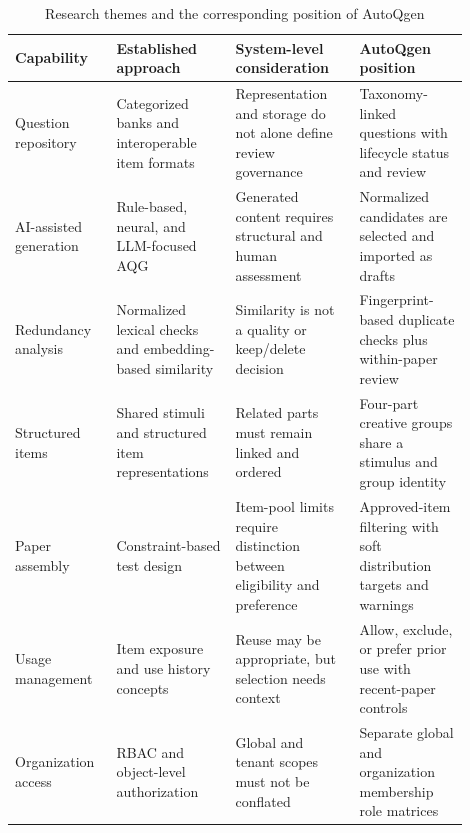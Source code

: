 \begin{table}[H]
    \centering
    \caption{Research themes and the corresponding position of AutoQgen}
    \label{tab:autoqgen_literature_position}
    \begin{tabular}{|p{0.19\linewidth}|p{0.24\linewidth}|p{0.25\linewidth}|p{0.22\linewidth}|}
        \hline
        \textbf{Capability} & \textbf{Established approach} & \textbf{System-level consideration} & \textbf{AutoQgen position} \\
        \hline
        Question repository & Categorized banks and interoperable item formats \cite{moodleQuestionBank,imsQti3} & Representation and storage do not alone define review governance & Taxonomy-linked questions with lifecycle status and review \\
        \hline
        AI-assisted generation & Rule-based, neural, and LLM-focused AQG \cite{hoshinoNakagawa2005,du2017,kurdi2020,singh2023ChatGPT} & Generated content requires structural and human assessment & Normalized candidates are selected and imported as drafts \\
        \hline
        Redundancy analysis & Normalized lexical checks and embedding-based similarity \cite{agirre2012sts,reimers2019sbert} & Similarity is not a quality or keep/delete decision & Fingerprint-based duplicate checks plus within-paper review \\
        \hline
        Structured items & Shared stimuli and structured item representations \cite{mislevy2003ecd,imsQti3} & Related parts must remain linked and ordered & Four-part creative groups share a stimulus and group identity \\
        \hline
        Paper assembly & Constraint-based test design \cite{vanDerLinden2005} & Item-pool limits require distinction between eligibility and preference & Approved-item filtering with soft distribution targets and warnings \\
        \hline
        Usage management & Item exposure and use history concepts \cite{chaoChen2023} & Reuse may be appropriate, but selection needs context & Allow, exclude, or prefer prior use with recent-paper controls \\
        \hline
        Organization access & RBAC and object-level authorization \cite{sandhu1996rbac,owaspAccessControl} & Global and tenant scopes must not be conflated & Separate global and organization membership role matrices \\
        \hline
    \end{tabular}
\end{table}

